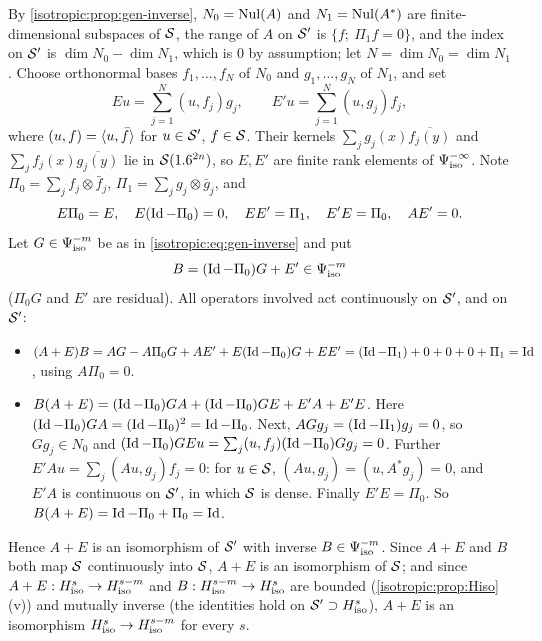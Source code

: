 By \cref{isotropic:prop:gen-inverse}, $N_0=\operatorname{Nul}(A)$ and $N_1=\operatorname{Nul}(A^*)$ are
finite-dimensional subspaces of $\mathcal{S}$, the range of $A$ on $\mathcal{S}'$ is
$\{f;\ \Pi_1f=0\}$, and the index on $\mathcal{S}'$ is $\dim N_0-\dim N_1$, which is $0$
by assumption; let $N=\dim N_0=\dim N_1$. Choose orthonormal bases
$f_1,\dots,f_N$ of $N_0$ and $g_1,\dots,g_N$ of $N_1$, and set
\begin{equation*}
  Eu=\sum_{j=1}^N(u,f_j)g_j,\qquad E'u=\sum_{j=1}^N(u,g_j)f_j ,
\end{equation*}
where $(u,f)=\langle u, \bar f\rangle$ for $u\in\mathcal{S}'$, $f\in\mathcal{S}$. Their kernels
$\sum_jg_j(x)\overline{f_j(y)}$ and $\sum_jf_j(x)\overline{g_j(y)}$ lie in
$\mathcal{S}(1.6^{2n})$, so $E,E'$ are finite rank elements of $\Psi^{-\infty}_{\mathrm{iso}}$. Note
$\Pi_0=\sum_jf_j\otimes\bar f_j$, $\Pi_1=\sum_jg_j\otimes\bar g_j$, and
\begin{equation*}
  E\Pi_0=E,\quad E(\operatorname{Id}-\Pi_0)=0,\quad EE'=\Pi_1,\quad E'E=\Pi_0,\quad AE'=0 .
\end{equation*}
Let $G\in\Psi^{-m}_{\mathrm{iso}}$ be as in \eqref{isotropic:eq:gen-inverse} and put
\begin{equation*}
  B=(\operatorname{Id}-\Pi_0)G+E'\in\Psi^{-m}_{\mathrm{iso}}
\end{equation*}
($\Pi_0G$ and $E'$ are residual). All operators involved act continuously on
$\mathcal{S}'$, and on $\mathcal{S}'$:
\begin{itemize}
\item $(A+E)B=AG-A\Pi_0G+AE'+E(\operatorname{Id}-\Pi_0)G+EE'=(\operatorname{Id}-\Pi_1)+0+0+0+\Pi_1=\operatorname{Id}$, using
  $A\Pi_0=0$.
\item $B(A+E)=(\operatorname{Id}-\Pi_0)GA+(\operatorname{Id}-\Pi_0)GE+E'A+E'E$. Here
  $(\operatorname{Id}-\Pi_0)GA=(\operatorname{Id}-\Pi_0)^2=\operatorname{Id}-\Pi_0$. Next, $AGg_j=(\operatorname{Id}-\Pi_1)g_j=0$, so
  $Gg_j\in N_0$ and $(\operatorname{Id}-\Pi_0)GEu=\sum_j(u,f_j)(\operatorname{Id}-\Pi_0)Gg_j=0$. Further
  $E'Au=\sum_j(Au,g_j)f_j=0$: for $u\in\mathcal{S}$, $(Au,g_j)=(u,A^*g_j)=0$, and $E'A$ is
  continuous on $\mathcal{S}'$, in which $\mathcal{S}$ is dense. Finally $E'E=\Pi_0$. So
  $B(A+E)=\operatorname{Id}-\Pi_0+\Pi_0=\operatorname{Id}$.
\end{itemize}
Hence $A+E$ is an isomorphism of $\mathcal{S}'$ with inverse $B\in\Psi^{-m}_{\mathrm{iso}}$. Since
$A+E$ and $B$ both map $\mathcal{S}$ continuously into $\mathcal{S}$, $A+E$ is an isomorphism of
$\mathcal{S}$; and since $A+E:H^{s}_{\mathrm{iso}}\to H^{s-m}_{\mathrm{iso}}$ and $B:H^{s-m}_{\mathrm{iso}}\to H^{s}_{\mathrm{iso}}$ are
bounded (\cref{isotropic:prop:Hiso}(v)) and mutually inverse (the identities
hold on $\mathcal{S}'\supset H^{s}_{\mathrm{iso}}$), $A+E$ is an isomorphism
$H^{s}_{\mathrm{iso}}\to H^{s-m}_{\mathrm{iso}}$ for every $s$.

\subsection*{}

